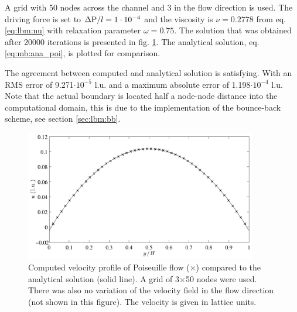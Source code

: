 A grid with 50 nodes across the channel and 3 in the flow direction is
used. The driving force is set to $\Delta \mathrm{P} / l = 1\cdot 10^{-4}$
and the viscosity is $\nu = 0.2778$ from eq. \eqref{eq:lbm:nu} with
relaxation parameter $\omega = 0.75$. The solution that was obtained
after 20000 iterations is presented in fig. \ref{fig:mb:poi}. The
analytical solution, eq. \eqref{eq:mb:ana_poi}, is plotted for
comparison.

The agreement between computed and analytical solution is
satisfying. With an RMS error of 9.271$\cdot 10^{-5}$ l.u. and a maximum
absolute error of 1.198$\cdot10^{-4}$ l.u. Note that the actual boundary
is located half a node-node distance into the computational domain,
this is due to the implementation of the bounce-back scheme, see
section \ref{sec:lbm:bb}.  

\begin{figure}
\begin{center}
\includegraphics[width=0.9\textwidth]{fig/poiseuille.pdf}
\end{center}
\caption{Computed velocity profile of Poiseuille flow ($\times$)
  compared to the analytical solution (solid line). A grid of
  3$\times$50 nodes were used. There was also no variation of the
  velocity field in the flow direction (not shown in this
  figure). The velocity is given in lattice units.}
\label{fig:mb:poi}
\end{figure}

